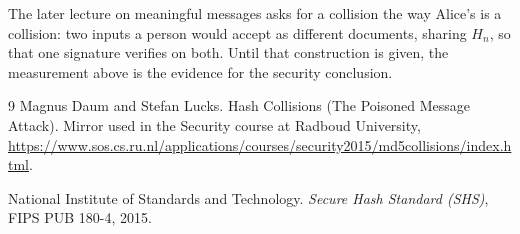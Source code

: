 \documentclass[11pt,a4paper]{article}
\newcommand{\Hn}{H_{n}}
\begin{document}
The later lecture on meaningful messages asks for a collision the way Alice's
is a collision: two inputs a person would accept as different documents,
sharing \(\Hn\), so that one signature verifies on both.
Until that construction is given, the measurement above is the evidence
for the security conclusion.

\begin{thebibliography}{9}
Magnus Daum and Stefan Lucks.
\newblock Hash Collisions (The Poisoned Message Attack).
\newblock Mirror used in the Security course at Radboud University,
\newblock \url{https://www.sos.cs.ru.nl/applications/courses/security2015/md5collisions/index.html}.

National Institute of Standards and Technology.
\newblock \emph{Secure Hash Standard (SHS)}, FIPS PUB 180-4, 2015.
\end{thebibliography}
\end{document}
